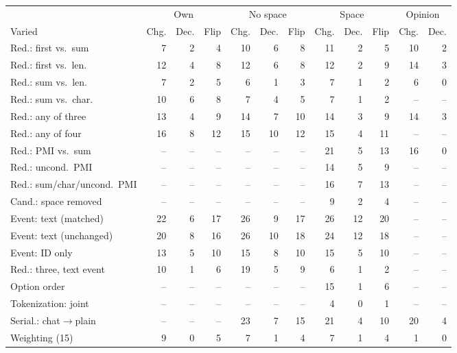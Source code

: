 \begin{table}[t]
\centering\scriptsize
\setlength{\tabcolsep}{0.55pt}\renewcommand{\arraystretch}{0.9}
\begin{tabular}{@{}lrrrrrrrrrrr@{}}
\toprule
& \multicolumn{3}{c}{Own} & \multicolumn{3}{c}{No space} & \multicolumn{3}{c}{Space} & \multicolumn{2}{c}{Opinion} \\
\cmidrule(lr){2-4}\cmidrule(lr){5-7}\cmidrule(lr){8-10}\cmidrule(l){11-12}
Varied & Chg. & Dec. & Flip & Chg. & Dec. & Flip & Chg. & Dec. & Flip & Chg. & Dec. \\
\midrule
Red.: first vs.\ sum & 7 & 2 & 4 & 10 & 6 & 8 & 11 & 2 & 5 & 10 & 2 \\
Red.: first vs.\ len. & 12 & 4 & 8 & 12 & 6 & 8 & 12 & 2 & 9 & 14 & 3 \\
Red.: sum vs.\ len. & 7 & 2 & 5 & 6 & 1 & 3 & 7 & 1 & 2 & 6 & 0 \\
Red.: sum vs.\ char. & 10 & 6 & 8 & 7 & 4 & 5 & 7 & 1 & 2 & -- & -- \\
Red.: any of three & 13 & 4 & 9 & 14 & 7 & 10 & 14 & 3 & 9 & 14 & 3 \\
Red.: any of four & 16 & 8 & 12 & 15 & 10 & 12 & 15 & 4 & 11 & -- & -- \\
Red.: PMI vs.\ sum & -- & -- & -- & -- & -- & -- & 21 & 5 & 13 & 16 & 0 \\
Red.: uncond.\ PMI & -- & -- & -- & -- & -- & -- & 14 & 5 & 9 & -- & -- \\
Red.: sum/char/uncond.\ PMI & -- & -- & -- & -- & -- & -- & 16 & 7 & 13 & -- & -- \\
Cand.: space removed & -- & -- & -- & -- & -- & -- & 9 & 2 & 4 & -- & -- \\
Event: text (matched) & 22 & 6 & 17 & 26 & 9 & 17 & 26 & 12 & 20 & -- & -- \\
Event: text (unchanged) & 20 & 8 & 16 & 26 & 10 & 18 & 24 & 12 & 18 & -- & -- \\
Event: ID only & 13 & 5 & 10 & 15 & 8 & 10 & 15 & 5 & 10 & -- & -- \\
Red.: three, text event & 10 & 1 & 6 & 19 & 5 & 9 & 6 & 1 & 2 & -- & -- \\
Option order & -- & -- & -- & -- & -- & -- & 15 & 1 & 6 & -- & -- \\
Tokenization: joint & -- & -- & -- & -- & -- & -- & 4 & 0 & 1 & -- & -- \\
Serial.: chat$\to$plain & -- & -- & -- & 23 & 7 & 15 & 21 & 4 & 10 & 20 & 4 \\
Weighting (15) & 9 & 0 & 5 & 7 & 1 & 4 & 7 & 1 & 4 & 1 & 0 \\

\end{tabular}
\end{table}
